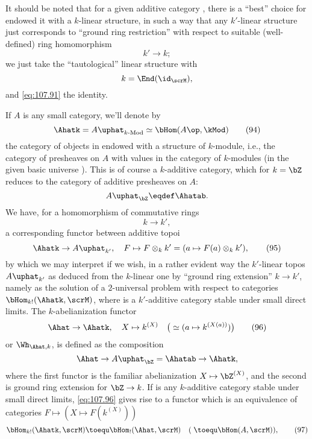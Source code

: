 It should be noted that for a given additive category \scrM, there is
a ``best'' choice for endowed it with a $k$-linear structure, in such
a way that any $k'$-linear structure just corresponds to ``ground ring
restriction'' with respect to suitable (well-defined) ring
homomorphism
\[k'\to k;\]
we just take the ``tautological'' linear structure with
\[k=\End(\id_\scrM),\]
and \eqref{eq:107.91} the identity.

If $A$ is any small category, we'll denote by
\begin{equation}
  \label{eq:107.94}
  \Ahatk = A\uphat_{k\textup{-Mod}} \simeq \bHom(A\op,\kMod)\tag{94}
\end{equation}
the category of objects in \Ahat{} endowed with a structure of
$k$-module, i.e., the category of presheaves on $A$ with values in the
category \kMod{} of $k$-modules (in the given basic universe
\scrU). This is of course a $k$-additive category, which for $k=\bZ$
reduces to the category of additive presheaves on $A$:
\[ A\uphat_{\bZ} \eqdef \Ahatab.\]
We have, for a homomorphism of commutative rings
\[k\to k',\]
a corresponding functor between additive topoi
\begin{equation}
  \label{eq:107.95}
  \Ahatk \to A\uphat_{k'}, \quad
  F\mapsto F\otimes_k k' = (a\mapsto F(a)\otimes_k k'),\tag{95}
\end{equation}
by which we may interpret if we wish, in a rather evident way the
$k'$-linear topos $A\uphat_{k'}$ as deduced from the $k$-linear one
\Ahatk{} by ``ground ring extension'' $k\to k'$, namely as the
solution of a $2$-universal problem with respect to categories
$\bHom_{k!}(\Ahatk,\scrM)$, where \scrM{} is a $k'$-additive category
stable under small direct limits. The $k$-abelianization functor
\begin{equation}
  \label{eq:107.96}
  \Ahat\to\Ahatk, \quad X\mapsto k^{(X)}\quad\bigl(\;\simeq (a \mapsto
  k^{(X(a))})\bigr)\tag{96} 
\end{equation}
or $\Wh_{\Ahat,k}$, is defined as the composition
\[\Ahat\to A\uphat_{\bZ} = \Ahatab\to \Ahatk,\]
where the first functor is the familiar abelianization
$X\mapsto \bZ^{(X)}$, and the second is ground ring extension for
$\bZ\to k$. If \scrM{} is any $k$-additive category stable under small
direct limits, \eqref{eq:107.96} gives rise to a functor which is an
equivalence of categories $F\mapsto(X\mapsto F(k^{(X)}))$
\begin{equation}
  \label{eq:107.97}
  \bHom_{k!}(\Ahatk,\scrM)\toequ\bHom_!(\Ahat,\scrM) \quad (\;\toequ
  \bHom(A,\scrM)),\tag{97} 
\end{equation}
